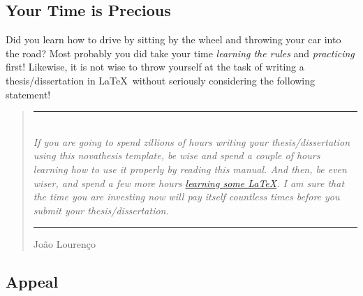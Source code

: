 \subsection{Your Time is Precious}
\label{sub:time_is_money}

Did you learn how to drive by sitting by the wheel and throwing your car into the road?  Most probably you did take your time \emph{learning the rules} and \emph{practicing} first! Likewise, it is not wise to throw yourself at the task of writing a thesis/dissertation in \LaTeX\ without seriously considering the following statement!

\bgroup
\renewcommand{\mkcitation}[1]{\\[0ex]\parbox{\linewidth}{\hfill\textbf{#1}}}
\blockquote[João Lourenço]{%
  \rule{\linewidth}{2pt}\\\itshape
  If you are going to spend zillions of hours writing your thesis/dissertation using this \gls{novathesis} template, be wise and spend a couple of hours learning how to use it properly by reading this manual.  And then, be even wiser, and spend a few more hours \href{https://github.com/joaomlourenco/novathesis/wiki\#learning-latex}{learning some \LaTeX}.  I am sure that the time you are investing now will pay itself countless times before you submit your thesis/dissertation.\\\nopagebreak
  \rule{\linewidth}{2pt}%
}
\egroup

\subsection{Appeal}
\label{sub:appeal}

